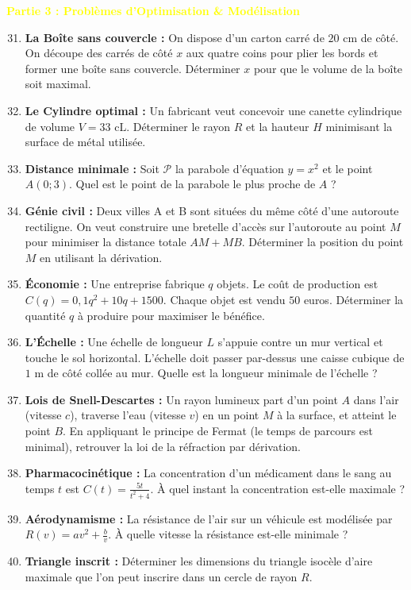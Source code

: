 \documentclass[10pt, a4paper]{article}
\begin{document}
\newpage

\Large
\textbf{\textcolor{yellow}{Partie 3 : Problèmes d'Optimisation \& Modélisation}}
\normalsize
\vspace{0.2cm}

\begin{enumerate}
    \setcounter{enumi}{30}
    \item \textbf{La Boîte sans couvercle :} On dispose d'un carton carré de $20\text{ cm}$ de côté. On découpe des carrés de côté $x$ aux quatre coins pour plier les bords et former une boîte sans couvercle. Déterminer $x$ pour que le volume de la boîte soit maximal.
    \item \textbf{Le Cylindre optimal :} Un fabricant veut concevoir une canette cylindrique de volume $V = 33\text{ cL}$. Déterminer le rayon $R$ et la hauteur $H$ minimisant la surface de métal utilisée.
    \item \textbf{Distance minimale :} Soit $\mathcal{P}$ la parabole d'équation $y = x^2$ et le point $A(0 ; 3)$. Quel est le point de la parabole le plus proche de $A$ ?
    \item \textbf{Génie civil :} Deux villes A et B sont situées du même côté d'une autoroute rectiligne. On veut construire une bretelle d'accès sur l'autoroute au point $M$ pour minimiser la distance totale $AM + MB$. Déterminer la position du point $M$ en utilisant la dérivation.
    \item \textbf{Économie :} Une entreprise fabrique $q$ objets. Le coût de production est $C(q) = 0{,}1q^2 + 10q + 1500$. Chaque objet est vendu $50$ euros. Déterminer la quantité $q$ à produire pour maximiser le bénéfice.
    \item \textbf{L'Échelle :} Une échelle de longueur $L$ s'appuie contre un mur vertical et touche le sol horizontal. L'échelle doit passer par-dessus une caisse cubique de $1\text{ m}$ de côté collée au mur. Quelle est la longueur minimale de l'échelle ?
    \item \textbf{Lois de Snell-Descartes :} Un rayon lumineux part d'un point $A$ dans l'air (vitesse $c$), traverse l'eau (vitesse $v$) en un point $M$ à la surface, et atteint le point $B$. En appliquant le principe de Fermat (le temps de parcours est minimal), retrouver la loi de la réfraction par dérivation.
    \item \textbf{Pharmacocinétique :} La concentration d'un médicament dans le sang au temps $t$ est $C(t) = \frac{5t}{t^2 + 4}$. À quel instant la concentration est-elle maximale ?
    \item \textbf{Aérodynamisme :} La résistance de l'air sur un véhicule est modélisée par $R(v) = av^2 + \frac{b}{v}$. À quelle vitesse la résistance est-elle minimale ?
    \item \textbf{Triangle inscrit :} Déterminer les dimensions du triangle isocèle d'aire maximale que l'on peut inscrire dans un cercle de rayon $R$.
\end{enumerate}
\end{document}
